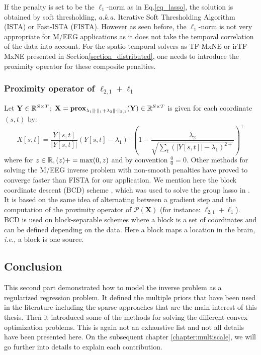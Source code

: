 If the penalty is set to be the $\ell_1$-norm as in Eq.\ref{eq_lasso}, the solution is obtained by soft thresholding, \textit{a.k.a.} Iterative Soft Thresholding Algorithm (ISTA) or Fast-ISTA (FISTA).
However as seen before, the $\ell_1$-norm is not very appropriate for M/EEG applications as it does not take the temporal correlation of the data into account. For the spatio-temporal solvers as TF-MxNE or irTF-MxNE presented in Section\ref{section_distributed}, one needs to introduce the proximity operator for these composite penalties.
\adjustwidth{1em}{0pt}
\subsubsection*{Proximity operator of $\ell_{2,1}+\ell_1$}
\vspace{-5pt}
Let $\mathbf{Y}\in\mathbb{R}^{S\times T}$; $\mathbf{X}=\textbf{prox}_{\lambda_1\|\cdot\|_1+\lambda_2\|\cdot\|_{2,1}}(\mathbf{Y})\in\mathbb{R}^{S\times T}$ is given for each coordinate $(s,t)$ by:
\vspace{-10pt}
\begin{equation} \label{prox_mixed}
	X[s,t]=\frac{Y[s,t]}{|Y[s,t]|}(Y[s,t]-\lambda_1)^+\left(1-\frac{\lambda_2}{\sqrt{\sum_t(|Y[s,t]|-\lambda_1)^{2+}}}\right)^+
\end{equation}
where for $z\in\mathbb{R}, (z)+=\max(0,z)$ and by convention $\frac{0}{0}=0$.
\endadjustwidth
Other methods for solving the M/EEG inverse problem with non-smooth penalties have proved to converge faster than FISTA for our application. We mention here the block coordinate descent (BCD) scheme \cite{tseng2010approximation}, which was used to solve the group lasso in \cite{rakotomamonjy2011surveying,qin2013efficient}. It is based on the same idea of alternating between a gradient step and the computation of the proximity operator of $\mathcal{P}(\mathbf{X})$ (for instance: $\ell_{2,1}+\ell_1$). BCD is used on block-separable schemes where a block is a set of coordinates and can be defined depending on the data. Here a block maps a location in the brain, \textit{i.e.}, a block is one source.
\subsection{Conclusion}
This second part demonstrated how to model the inverse problem as a regularized regression problem. It defined the multiple priors that have been used in the literature including the sparse approaches that are the main interest of this thesis. Then it introduced some of the methods for solving the different convex optimization problems. This is again not an exhaustive list and not all details have been presented here. On the subsequent chapter \ref{chapter:multiscale}, we will go further into details to explain each contribution.

